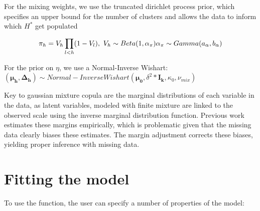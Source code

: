 \documentclass[
]{article}
\begin{document}
For the mixing weights, we use the truncated dirichlet process prior,
which specifies an upper bound for the number of clusters and allows the
data to inform which \(H^{*}\) get populated

\[\pi_{h} = V_{h}\prod_{l<h} (1-V_{l}),\  V_{h}\sim Beta(1, \alpha_{\pi})\\
        \alpha_{\pi} \sim Gamma(a_{\alpha}, b_{\alpha})\]

For the prior on \(\eta\), we use a Normal-Inverse Wishart:
\((\boldsymbol{\mu_{h}, \Delta_{h}}) \sim Normal-InverseWishart(\boldsymbol{\mu_{0}}, \delta^{2}*\boldsymbol{I_{k}},\kappa_{0}, \nu_{mix})\)

Key to gaussian mixture copula are the marginal distributions of each
variable in the data, as latent variables, modeled with finite mixture
are linked to the observed scale using the inverse marginal distribution
function. Previous work estimates these margins empirically, which is
problematic given that the missing data clearly biases these estimates.
The margin adjustment corrects these biases, yielding proper inference
with missing data.

\hypertarget{fitting-the-model}{%
\section{Fitting the model}\label{fitting-the-model}}

To use the function, the user can specify a number of properties of the
model:
\end{document}
